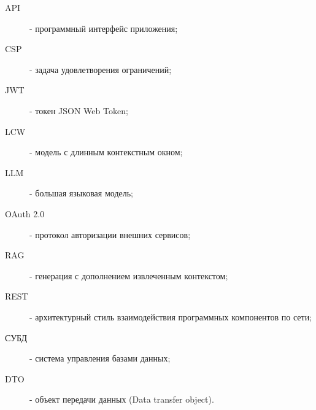 \label{sec:reduction}

\begin{description}
    \item[API] - программный интерфейс приложения;
    \item[CSP] - задача удовлетворения ограничений;
    \item[JWT] - токен JSON Web Token;
    \item[LCW] - модель с длинным контекстным окном;
    \item[LLM] - большая языковая модель;
    \item[OAuth 2.0] - протокол авторизации внешних сервисов;
    \item[RAG] - генерация с дополнением извлеченным контекстом;
    \item[REST] - архитектурный стиль взаимодействия программных компонентов по сети;
    \item[СУБД] - система управления базами данных;
    \item[DTO] - объект передачи данных (Data transfer object).
\end{description}
